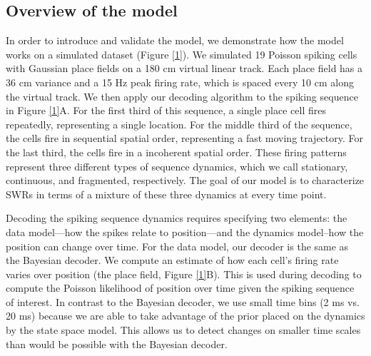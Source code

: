 \documentclass[times, twoside]{zHenriquesLab-StyleBioRxiv}
\begin{document}
\subsection*{Overview of the model}
In order to introduce and validate the model, we demonstrate how the model works on a simulated dataset (Figure \ref{1}). We simulated 19 Poisson spiking cells with Gaussian place fields on a 180 cm virtual linear track. Each place field has a 36 cm variance and a 15 Hz peak firing rate, which is spaced every 10 cm along the virtual track. We then apply our decoding algorithm to the spiking sequence in Figure \ref{1}A. For the first third of this sequence, a single place cell fires repeatedly, representing a single location. For the middle third of the sequence, the cells fire in sequential spatial order, representing a fast moving trajectory. For the last third, the cells fire in a incoherent spatial order. These firing patterns represent three different types of sequence dynamics, which we call stationary, continuous, and fragmented, respectively. The goal of our model is to characterize SWRs in terms of a mixture of these three dynamics at every time point.

Decoding the spiking sequence dynamics requires specifying two elements: the data model---how the spikes relate to position---and the dynamics model--how the position can change over time. For the data model, our decoder is the same as the Bayesian decoder. We compute an estimate of how each cell's firing rate varies over position (the place field, Figure \ref{1}B). This is used during decoding to compute the Poisson likelihood of position over time given the spiking sequence of interest. In contrast to the Bayesian decoder, we use small time bins (2 ms vs. 20 ms) because we are able to take advantage of the prior placed on the dynamics by the state space model. This allows us to detect changes on smaller time scales than would be possible with the Bayesian decoder.
\end{document}
